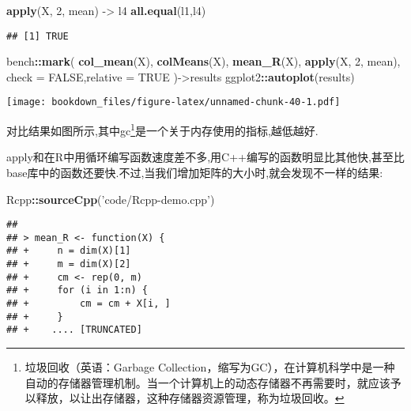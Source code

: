 \documentclass[]{ctexbook}
\newenvironment{Shaded}{\begin{snugshade}}{\end{snugshade}}
\newcommand{\DataTypeTok}[1]{\textcolor[rgb]{0.13,0.29,0.53}{#1}}
\newcommand{\DecValTok}[1]{\textcolor[rgb]{0.00,0.00,0.81}{#1}}
\newcommand{\KeywordTok}[1]{\textcolor[rgb]{0.13,0.29,0.53}{\textbf{#1}}}
\newcommand{\NormalTok}[1]{#1}
\newcommand{\OperatorTok}[1]{\textcolor[rgb]{0.81,0.36,0.00}{\textbf{#1}}}
\newcommand{\OtherTok}[1]{\textcolor[rgb]{0.56,0.35,0.01}{#1}}
\newcommand{\StringTok}[1]{\textcolor[rgb]{0.31,0.60,0.02}{#1}}
\begin{document}
\begin{Shaded}
\begin{Highlighting}[]
\KeywordTok{apply}\NormalTok{(X, }\DecValTok{2}\NormalTok{, mean) ->}\StringTok{ }\NormalTok{l4}
\KeywordTok{all.equal}\NormalTok{(l1,l4)}
\end{Highlighting}
\end{Shaded}

\begin{verbatim}
## [1] TRUE
\end{verbatim}

\begin{Shaded}
\begin{Highlighting}[]
\NormalTok{bench}\OperatorTok{::}\KeywordTok{mark}\NormalTok{(}
  \KeywordTok{col_mean}\NormalTok{(X),}
  \KeywordTok{colMeans}\NormalTok{(X),}
  \KeywordTok{mean_R}\NormalTok{(X),}
  \KeywordTok{apply}\NormalTok{(X, }\DecValTok{2}\NormalTok{, mean),}
  \DataTypeTok{check =} \OtherTok{FALSE}\NormalTok{,}\DataTypeTok{relative =} \OtherTok{TRUE}
\NormalTok{)->results}
\NormalTok{ggplot2}\OperatorTok{::}\KeywordTok{autoplot}\NormalTok{(results)}
\end{Highlighting}
\end{Shaded}

\texttt{[image: bookdown\_files/figure-latex/unnamed-chunk-40-1.pdf]}

对比结果如图所示,其中gc\footnote{垃圾回收（英语：Garbage Collection，缩写为GC），在计算机科学中是一种自动的存储器管理机制。当一个计算机上的动态存储器不再需要时，就应该予以释放，以让出存储器，这种存储器资源管理，称为垃圾回收。}是一个关于内存使用的指标,越低越好.

apply和在R中用循环编写函数速度差不多,用C++编写的函数明显比其他快,甚至比base库中的函数还要快.不过,当我们增加矩阵的大小时,就会发现不一样的结果:

\begin{Shaded}
\begin{Highlighting}[]
\NormalTok{Rcpp}\OperatorTok{::}\KeywordTok{sourceCpp}\NormalTok{(}\StringTok{'code/Rcpp-demo.cpp'}\NormalTok{)}
\end{Highlighting}
\end{Shaded}

\begin{verbatim}
## 
## > mean_R <- function(X) {
## +     n = dim(X)[1]
## +     m = dim(X)[2]
## +     cm <- rep(0, m)
## +     for (i in 1:n) {
## +         cm = cm + X[i, ]
## +     }
## +    .... [TRUNCATED]
\end{verbatim}
\end{document}
